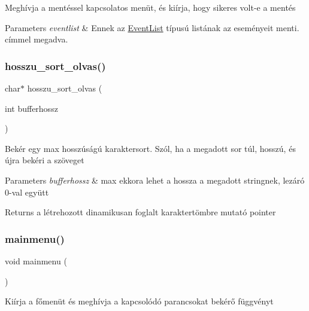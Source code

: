 Meghívja a mentéssel kapcsolatos menüt, és kiírja, hogy sikeres volt-\/e a mentés 
\begin{DoxyParams}{Parameters}
{\em eventlist} & Ennek az \hyperlink{struct_event_list}{Event\+List} típusú listának az eseményeit menti. címmel megadva. \\
\hline
\end{DoxyParams}
\mbox{\label{group__menu_gab9ac014b764791c1dc71c187dca898f7}} 
\subsubsection{\texorpdfstring{hosszu\+\_\+sort\+\_\+olvas()}{hosszu\_sort\_olvas()}}
{\footnotesize\ttfamily char$\ast$ hosszu\+\_\+sort\+\_\+olvas (\begin{DoxyParamCaption}\item[{int}]{bufferhossz }\end{DoxyParamCaption})}

Bekér egy max hosszúságú karaktersort. Szól, ha a megadott sor túl, hosszú, és újra bekéri a szöveget 
\begin{DoxyParams}{Parameters}
{\em bufferhossz} & max ekkora lehet a hossza a megadott stringnek, lezáró 0-\/val együtt \\
\hline
\end{DoxyParams}
\begin{DoxyReturn}{Returns}
a létrehozott dinamikusan foglalt karaktertömbre mutató pointer 
\end{DoxyReturn}
\mbox{\label{group__menu_gac86d3169260f5cacd0f792743957b054}} 
\subsubsection{\texorpdfstring{mainmenu()}{mainmenu()}}
{\footnotesize\ttfamily void mainmenu (\begin{DoxyParamCaption}{ }\end{DoxyParamCaption})}

Kiírja a főmenüt és meghívja a kapcsolódó parancsokat bekérő függvényt \mbox{\label{group__menu_ga069c1b762e46bba28b1f38b87d8d58aa}} 
